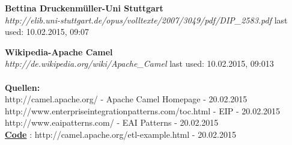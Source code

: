 \documentclass[12pt]{article}
\begin{document}
\begin{thebibliography}{56}

   \textbf{Bettina Druckenmüller-Uni Stuttgart}\\
  \textit{http://elib.uni-stuttgart.de/opus/volltexte/2007/3049/pdf/DIP\_2583.pdf}
  \newline last used: 10.02.2015, 09:07

   \textbf{Wikipedia-Apache Camel}\\
  \textit{http://de.wikipedia.org/wiki/Apache\_Camel}
  \newline last used: 10.02.2015, 09:013
 \\\\
 \textbf{Quellen:}\\
 http://camel.apache.org/ - Apache Camel Homepage - 20.02.2015 \\
 http://www.enterpriseintegrationpatterns.com/toc.html - EIP - 20.02.2015 \\
 http://www.eaipatterns.com/ - EAI Patterns - 20.02.2015 \\
 \underline{\textbf{Code}} : http://camel.apache.org/etl-example.html - 20.02.2015 
 
 
\end{thebibliography}
\end{document}
